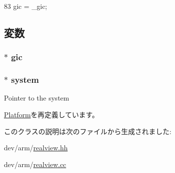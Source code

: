 \begin{DoxyCode}
83 { gic = _gic; }
\end{DoxyCode}


\subsection{変数}
\hypertarget{classRealView_a2e2266dca56928f63667e994933169ee}{
\subsubsection[{gic}]{$\ast$ {\bf gic}}}
\label{classRealView_a2e2266dca56928f63667e994933169ee}
\hypertarget{classRealView_af27ccd765f13a4b7bd119dc7579e2746}{
\subsubsection[{system}]{$\ast$ {\bf system}}}
\label{classRealView_af27ccd765f13a4b7bd119dc7579e2746}
Pointer to the system 

\hyperlink{classPlatform_af27ccd765f13a4b7bd119dc7579e2746}{Platform}を再定義しています。

このクラスの説明は次のファイルから生成されました:\begin{DoxyCompactItemize}
\item 
dev/arm/\hyperlink{realview_8hh}{realview.hh}\item 
dev/arm/\hyperlink{realview_8cc}{realview.cc}\end{DoxyCompactItemize}
